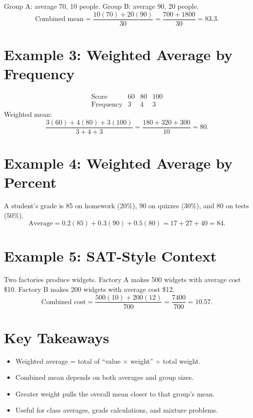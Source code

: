 \documentclass[12pt]{article}
\begin{document}
Group A: average 70, 10 people.  
Group B: average 90, 20 people.  
\[
\text{Combined mean} = \frac{10(70)+20(90)}{30} = \frac{700+1800}{30} = \boxed{83.3}.
\]

\section*{Example 3: Weighted Average by Frequency}

\[
\begin{array}{c|ccc}
\text{Score} & 60 & 80 & 100\\ \hline
\text{Frequency} & 3 & 4 & 3
\end{array}
\]
Weighted mean:
\[
\frac{3(60)+4(80)+3(100)}{3+4+3} = \frac{180+320+300}{10} = \boxed{80}.
\]

\section*{Example 4: Weighted Average by Percent}

A student’s grade is 85 on homework (20\%), 90 on quizzes (30\%), and 80 on tests (50\%).  
\[
\text{Average} = 0.2(85) + 0.3(90) + 0.5(80) = 17 + 27 + 40 = \boxed{84}.
\]

\section*{Example 5: SAT-Style Context}

Two factories produce widgets. Factory A makes 500 widgets with average cost \$10.  
Factory B makes 200 widgets with average cost \$12.  
\[
\text{Combined cost} = \frac{500(10)+200(12)}{700} = \frac{7400}{700} = \boxed{10.57}.
\]

\section*{Key Takeaways}
\begin{itemize}
  \item Weighted average = total of “value × weight” ÷ total weight.
  \item Combined mean depends on both averages and group sizes.
  \item Greater weight pulls the overall mean closer to that group’s mean.
  \item Useful for class averages, grade calculations, and mixture problems.
\end{itemize}

\newpage
\end{document}
